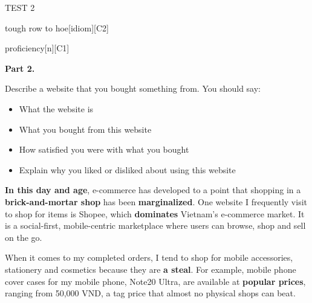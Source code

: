 \begin{glossarymc}[Cambridge 15]
\begin{test}{TEST 2}
\begin{VocabExplain}[Part 1]
            \begin{ExplainCard}{tough row to hoe}[idiom][C2]
            \end{ExplainCard}

            \begin{ExplainCard}{proficiency}[n][C1]
            \end{ExplainCard}
        \end{VocabExplain}

    \noindent
    \textbf{Part 2.}
    \begin{qa}{Describe a website that you bought something from. You should say: 
    \begin{itemize}
        \item What the website is
        \item What you bought from this website
        \item How satisfied you were with what you bought
        \item Explain why you liked or disliked about using this website
    \end{itemize}}

    \textbf{In this day and age}, e-commerce has developed to a point that shopping in a \textbf{brick-and-mortar shop} has been \textbf{marginalized}. One website I frequently visit to shop for items is Shopee, which \textbf{dominates} Vietnam’s e-commerce market. It is a social-first, mobile-centric marketplace where users can browse, shop and sell on the go.  

    When it comes to my completed orders, I tend to shop for mobile accessories, stationery and cosmetics because they are \textbf{a steal}. For example, mobile phone cover cases for my mobile phone, Note20 Ultra, are available at \textbf{popular prices}, ranging from 50,000 VND, a tag price that almost no physical shops can beat.  


\end{qa}
\end{test}
\end{glossarymc}
